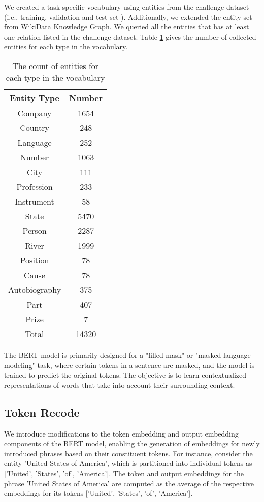 \documentclass[]{ceurart}
\begin{document}
We created a task-specific vocabulary using entities from the challenge dataset (i.e., training, validation and test set ). Additionally, we extended the entity set from WikiData Knowledge Graph.  We queried  all the entities that has at least one relation listed in the challenge dataset. Table \ref{tab-vocabulary} gives the  number of collected entities for each type in the vocabulary. 
\begin{table}
\caption{The count of entities for each type in the vocabulary}\label{tab-vocabulary}

\begin{tabular}{|c|c|}
\hline
Entity Type & Number \\
\hline
Company & 1654 \\
Country & 248 \\
Language & 252 \\
Number & 1063 \\
City & 111 \\
Profession & 233 \\
Instrument & 58 \\
State & 5470 \\
Person & 2287 \\
River & 1999 \\
Position & 78 \\
Cause & 78 \\
Autobiography & 375 \\
Part & 407 \\
Prize & 7 \\
\hline
Total & 14320\\
\hline
\end{tabular}
\end{table}

 The BERT model is primarily designed for a "filled-mask" or "masked language modeling" task, where certain tokens in a sentence are masked, and the model is trained to predict the original tokens. The objective is to learn contextualized representations of words that take into account their surrounding context.


\subsection{Token Recode }

We introduce modifications to the token embedding and output embedding components of the BERT model, enabling the generation of embeddings for newly introduced phrases based on their constituent tokens. For instance, consider the entity 'United States of America', which is partitioned into individual tokens as ['United', 'States', 'of', 'America']. The token and output embeddings for the phrase 'United States of America' are computed as the average of the respective embeddings for its tokens ['United', 'States', 'of', 'America'].
\end{document}

